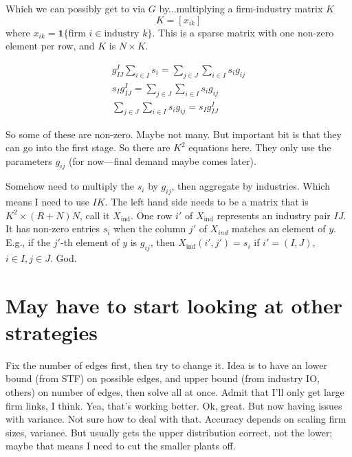 \documentclass[11pt]{article}
\begin{document}
Which we can possibly get to via $G$ by...multiplying a firm-industry matrix $K$
\[
K = [x_{ik} ]
\]
where $x_{ik} = \mathbf{1} \{ \text{firm } i \in \text{industry } k \}$. This is a sparse matrix with one non-zero element per row, and $K$ is $N \times K$. 

\begin{gather}
g^I_{IJ} \sum_{i\in I} s_i = \sum_{j \in J} \sum_{i \in I} s_i g_{ij} \\
s_I g^I_{IJ} = \sum_{j \in J} \sum_{i \in I} s_i g_{ij} \\
\sum_{j \in J} \sum_{i \in I} s_i g_{ij} = s_I g^I_{IJ}
\end{gather}
 
 So some of these are non-zero. Maybe not many. But important bit is that they can go into the first stage. So there are $K^2$ equations here. They only use the parameters $g_{ij}$ (for now---final demand maybe comes later).
 
 Somehow need to multiply the $s_i$ by $g_{ij}$, then aggregate by industries. Which means I need to use $IK$. The left hand side needs to be a matrix that is $K^2 \times (R+N)N$, call it $X_{\text{ind}}$. One row $i'$ of $X_{\text{ind}}$ represents an industry pair $IJ$. It has non-zero entries $s_i$ when the column $j'$ of $X_{ind}$ matches an element of $y$. E.g., if the $j'$-th element of $y$ is $g_{ij}$, then $X_{\text{ind}}(i',j') = s_i$ if $i'=(I,J)$, $i \in I, j \in J$. God.




\section{May have to start looking at other strategies}
Fix the number of edges first, then try to change it. Idea is to have an lower bound (from STF) on possible edges, and upper bound (from industry IO, others) on number of edges, then solve all at once. Admit that I'll only get large firm links, I think. Yea, that's working better. Ok, great. But now having issues with variance. Not sure how to deal with that. Accuracy depends on scaling firm sizes, variance. But usually gets the upper distribution correct, not the lower; maybe that means I need to cut the smaller plants off.



\end{document}
